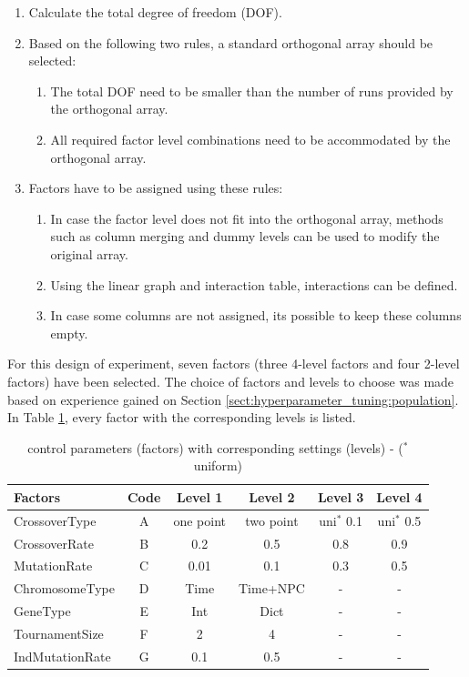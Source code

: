 \begin{enumerate}
	\item Calculate the total degree of freedom (DOF). 
	\item Based on the following two rules, a standard orthogonal array should be selected:
	\begin{enumerate}
		\item The total DOF need to be smaller than the number of runs provided by the orthogonal array.
		\item All required factor level combinations need to be accommodated by the orthogonal array.
	\end{enumerate}
	
	\item Factors have to be assigned using these rules: 
	\begin{enumerate}
		\item In case the factor level does not fit into the orthogonal array, methods such as column merging and dummy levels can be used to modify the original array.
		\item Using the linear graph and interaction table, interactions can be defined. 
		\item In case some columns are not assigned, its possible to keep these columns empty.
	\end{enumerate}
\end{enumerate}

For this design of experiment, seven factors (three 4-level factors and four 2-level factors) have been selected. The choice of factors and levels to choose was made based on experience gained on Section \ref{sect:hyperparameter_tuning:population}. In Table \ref{tab:hyperparameter_tuning:settings_to_level}, every factor with the corresponding levels is listed.

\begin{table}[ht]
	\centering
	\small
	\begin{tabular}{ l|c|cccc }
		\hline
		Factors & Code & Level 1 & Level 2 & Level 3 & Level 4\\
		\hline
		CrossoverType 		& A & one point & two point & uni$^*$ 0.1 & uni$^*$ 0.5\\
		CrossoverRate    	& B & 0.2 & 0.5 & 0.8 & 0.9\\
		MutationRate   		& C & 0.01 & 0.1 & 0.3 & 0.5\\
		ChromosomeType   	& D & Time & Time+NPC & - & -\\
		GeneType			& E & Int & Dict & - & -\\
		TournamentSize 		& F & 2 & 4 & - & -\\
		IndMutationRate		& G & 0.1 & 0.5 & - & -\\
		\hline
	\end{tabular}
\caption{control parameters (factors) with corresponding settings (levels) - ($^*$uniform)}
\label{tab:hyperparameter_tuning:settings_to_level}
\end{table}

